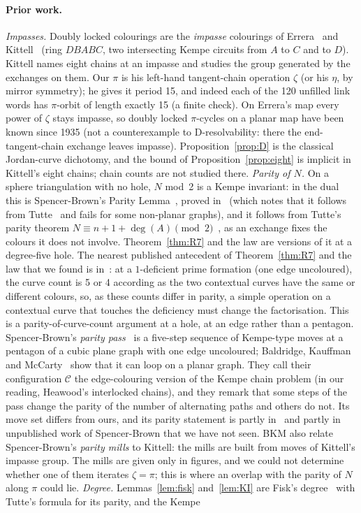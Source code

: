 \documentclass[11pt]{article}
\theoremstyle{definition}
\begin{document}
\paragraph{Prior work.} \emph{Impasses.} Doubly locked colourings are the \emph{impasse} colourings of Errera~\cite{errera1921} and Kittell~\cite{kittell1935} (ring $DBABC$, two intersecting Kempe circuits from $A$ to $C$ and to $D$). Kittell names eight chains at an impasse and studies the group generated by the exchanges on them. Our $\pi$ is his left-hand tangent-chain operation $\zeta$ (or his $\eta$, by mirror symmetry); he gives it period 15, and indeed each of the 120 unfilled link words has $\pi$-orbit of length exactly 15 (a finite check). On Errera's map every power of $\zeta$ stays impasse, so doubly locked $\pi$-cycles on a planar map have been known since 1935 (not a counterexample to D-resolvability: there the end-tangent-chain exchange leaves impasse). Proposition~\ref{prop:D} is the classical Jordan-curve dichotomy, and the bound of Proposition~\ref{prop:eight} is implicit in Kittell's eight chains; chain counts are not studied there. \emph{Parity of $N$.} On a sphere triangulation with no hole, $N$ mod~2 is a Kempe invariant: in the dual this is Spencer-Brown's Parity Lemma~\cite{spencerbrown}, proved in~\cite[Sec.~3]{kauffman2005} (which notes that it follows from Tutte~\cite{tutte1948} and fails for some non-planar graphs), and it follows from Tutte's parity theorem $N\equiv n+1+\deg(A)\pmod 2$~\cite{tutte1969,mohar2021}, as an exchange fixes the colours it does not involve. Theorem~\ref{thm:R7} and the law are versions of it at a degree-five hole. The nearest published antecedent of Theorem~\ref{thm:R7} and the law that we found is in~\cite[Sec.~4]{kauffman2005}: at a $1$-deficient prime formation (one edge uncoloured), the curve count is 5 or 4 according as the two contextual curves have the same or different colours, so, as these counts differ in parity, a simple operation on a contextual curve that touches the deficiency must change the factorisation. This is a parity-of-curve-count argument at a hole, at an edge rather than a pentagon. Spencer-Brown's \emph{parity pass}~\cite[Sec.~5]{kauffman2005} is a five-step sequence of Kempe-type moves at a pentagon of a cubic plane graph with one edge uncoloured; Baldridge, Kauffman and McCarty~\cite{bkm2026} show that it can loop on a planar graph. They call their configuration $\mathcal C$ the edge-colouring version of the Kempe chain problem (in our reading, Heawood's interlocked chains), and they remark that some steps of the pass change the parity of the number of alternating paths and others do not. Its move set differs from ours, and its parity statement is partly in~\cite[Sec.~5]{kauffman2005} and partly in unpublished work of Spencer-Brown that we have not seen. BKM also relate Spencer-Brown's \emph{parity mills} to Kittell: the mills are built from moves of Kittell's impasse group. The mills are given only in figures, and we could not determine whether one of them iterates $\zeta=\pi$; this is where an overlap with the parity of $N$ along $\pi$ could lie. \emph{Degree.} Lemmas~\ref{lem:fisk} and~\ref{lem:KI} are Fisk's degree~\cite{fisk1977} with Tutte's formula for its parity, and the Kempe 
\end{document}

